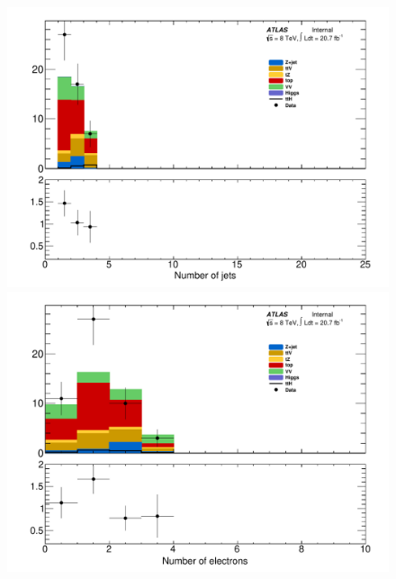 \begin{figure}[!htbp]
  \begin{minipage}[h]{0.5\textwidth}
    \centering \includegraphics[width=\textwidth]{figs/fake/plotCand_3lep_C_NJet}
  \end{minipage}\hfill
  \begin{minipage}[h]{0.5\textwidth}
    \centering \includegraphics[width=\textwidth]{figs/fake/plotCand_3lep_C_NElec}
  \end{minipage}\hfill
  \begin{minipage}[h]{0.5\textwidth}

\end{minipage}
\end{figure}

